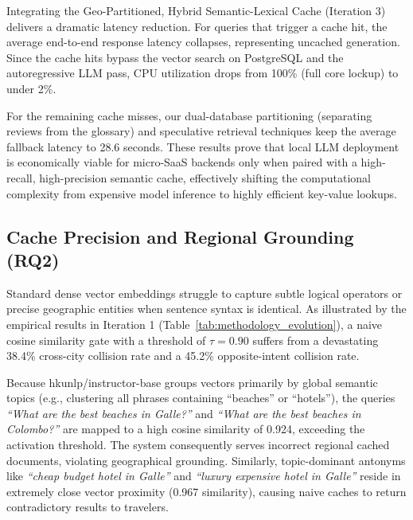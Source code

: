 \documentclass{ieeeaccess}
\begin{document}
Integrating the Geo-Partitioned, Hybrid Semantic-Lexical Cache (Iteration 3) delivers a dramatic latency reduction. For queries that trigger a cache hit, the average end-to-end response latency collapses, representing  uncached generation. Since the cache hits bypass the vector search on PostgreSQL and the autoregressive LLM pass, CPU utilization drops from 100\% (full core lockup) to under 2\%.

For the remaining cache misses, our dual-database partitioning (separating reviews from the glossary) and speculative retrieval techniques keep the average fallback latency to 28.6 seconds. These results prove that local LLM deployment is economically viable for micro-SaaS backends only when paired with a high-recall, high-precision semantic cache, effectively shifting the computational complexity from expensive model inference to highly efficient key-value lookups.

\subsection{Cache Precision and Regional Grounding (RQ2)}
Standard dense vector embeddings struggle to capture subtle logical operators or precise geographic entities when sentence syntax is identical. As illustrated by the empirical results in Iteration 1 (Table~\ref{tab:methodology_evolution}), a naive cosine similarity gate with a threshold of $\tau = 0.90$ suffers from a devastating {38.4\% cross-city collision rate} and a {45.2\% opposite-intent collision rate}.

Because hkunlp/instructor-base groups vectors primarily by global semantic topics (e.g., clustering all phrases containing ``beaches'' or ``hotels''), the queries \emph{``What are the best beaches in Galle?''} and \emph{``What are the best beaches in Colombo?''} are mapped to a high cosine similarity of {0.924}, exceeding the activation threshold. The system consequently serves incorrect regional cached documents, violating geographical grounding. Similarly, topic-dominant antonyms like \emph{``cheap budget hotel in Galle''} and \emph{``luxury expensive hotel in Galle''} reside in extremely close vector proximity ({0.967 similarity}), causing naive caches to return contradictory results to travelers.
\end{document}
